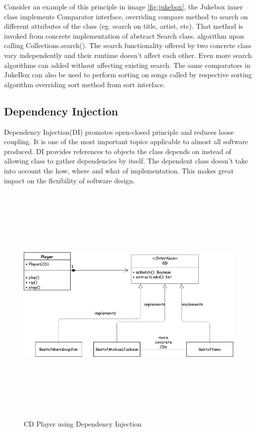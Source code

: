 \noindent
Consider an example of this principle in image \ref{fig:jukebox}, the Jukebox inner class implements Comparator interface, overriding compare method to search on different attributes of the class (eg. search on title, artist, etc). That method is invoked from concrete implementation of abstract Search class.
algorithm upon calling Collections.search(). The search functionality offered by two concrete class vary
independently and their runtime doesn't affect each other. Even more search algorithms can added without
affecting existing search. The same comparators in JukeBox can also be used to perform sorting on songs
called by respective sorting algorithm overriding sort method from sort interface.

\pagebreak

\subsection{Dependency Injection}\label{diuse}
Dependency Injection(DI) promotes open-closed principle and reduces loose coupling. It is one of the most
important topics applicable to almost all software produced. DI provides references to objects the class
depends on instead of allowing class to gather dependencies by itself. The dependent class doesn't
take into account the how, where and what of implementation. This makes great impact on the flexibility of
software design.
\begin{figure}[h!]
  \centering
  \includegraphics[width=15cm,height=12cm,keepaspectratio]{../media/crawler/dinjection.png}
  \caption{CD Player using Dependency Injection \cite{ocdi}}
  \label{fig:dinjection}
\end{figure}

